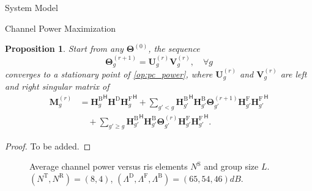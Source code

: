 \documentclass[journal]{IEEEtran}
\newtheorem{proposition}{Proposition}
\begin{document}
\begin{section}{System Model}
\begin{subsection}{Channel Power Maximization}
		\begin{proposition}
			Start from any $\mathbf{\Theta}^{(0)}$, the sequence
			\begin{equation}
				\mathbf{\Theta}_g^{(r+1)} = \mathbf{U}_g^{(r)} \mathbf{V}_g^{(r)}, \quad \forall g
			\end{equation}
			converges to a stationary point of \eqref{op:pc_power}, where $\mathbf{U}_g^{(r)}$ and $\mathbf{V}_g^{(r)}$ are left and right singular matrix of
			\begin{equation}
				\begin{split}
					\mathbf{M}_g^{(r)}
					& = {\mathbf{H}_g^\mathrm{B}}^\mathsf{H} \mathbf{H}^\mathrm{D} {\mathbf{H}_g^\mathrm{F}}^\mathsf{H} + \sum_{g' < g} {\mathbf{H}_{g'}^\mathrm{B}}^\mathsf{H} \mathbf{H}_{g'}^\mathrm{B} \mathbf{\Theta}_{g'}^{(r+1)} \mathbf{H}_{g'}^\mathrm{F} {\mathbf{H}_{g'}^\mathrm{F}}^\mathsf{H} \\
					& \quad + \sum_{g' \ge g} {\mathbf{H}_{g'}^\mathrm{B}}^\mathsf{H} \mathbf{H}_{g'}^\mathrm{B} \mathbf{\Theta}_{g'}^{(r)} \mathbf{H}_{g'}^\mathrm{F} {\mathbf{H}_{g'}^\mathrm{F}}^\mathsf{H}.
				\end{split}
			\end{equation}
		\end{proposition}

		\begin{proof}
			To be added.
		\end{proof}

		\begin{figure}[!t]
			\centering
			\resizebox{0.65\columnwidth}{!}{
				
			}
			\caption{Average channel power versus \gls{ris} elements $N^\mathrm{S}$ and group size $L$. $(N^\mathrm{T}, N^\mathrm{R}) = (8, 4)$, $(\Lambda^\mathrm{D}, \Lambda^\mathrm{F}, \Lambda^\mathrm{B}) = (65, 54, 46) \unit{dB}$.}
			\label{sm:pc_power_sx}
		\end{figure}


\end{subsection}
\end{section}
\end{document}
